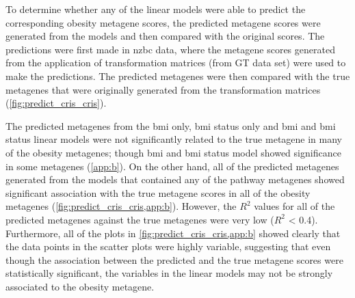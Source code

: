 To determine whether any of the linear models were able to predict the corresponding obesity metagene scores, the predicted metagene scores were generated from the models and then compared with the original scores.
The predictions were first made in \gls{nzbc} data, where the metagene scores generated from the application of transformation matrices (from GT data set) were used to make the predictions.
The predicted metagenes were then compared with the true metagenes that were originally generated from the transformation matrices (\cref{fig:predict_cris_cris}).

The predicted metagenes from the \gls{bmi} only, \gls{bmi} status only and \gls{bmi} and \gls{bmi} status linear models were not significantly related to the true metagene in many of the obesity metagenes; though \gls{bmi} and \gls{bmi} status model showed significance in some metagenes (\cref{app:b}).
On the other hand, all of the predicted metagenes generated from the models that contained any of the pathway metagenes showed significant association with the true metagene scores in all of the obesity metagenes (\cref{fig:predict_cris_cris,app:b}).
However, the $R^2$ values for all of the predicted metagenes against the true metagenes were very low ($R^2$ \textless{} 0.4).
Furthermore, all of the plots in \cref{fig:predict_cris_cris,app:b} showed clearly that the data points in the scatter plots were highly variable, suggesting that even though the association between the predicted and the true metagene scores were statistically significant, the variables in the linear models may not be strongly associated to the obesity metagene.

